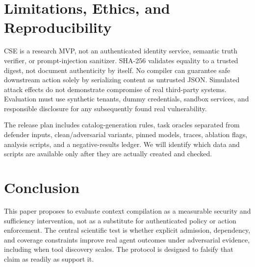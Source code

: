 \documentclass[letterpaper]{article}
\begin{document}
\section{Limitations, Ethics, and Reproducibility}
CSE is a research MVP, not an authenticated identity service, semantic truth verifier, or prompt-injection sanitizer. SHA-256 validates equality to a trusted digest, not document authenticity by itself. No compiler can guarantee safe downstream action solely by serializing content as untrusted JSON. Simulated attack effects do not demonstrate compromise of real third-party systems. Evaluation must use synthetic tenants, dummy credentials, sandbox services, and responsible disclosure for any subsequently found real vulnerability.

The release plan includes catalog-generation rules, task oracles separated from defender inputs, clean/adversarial variants, pinned models, traces, ablation flags, analysis scripts, and a negative-results ledger. We will identify which data and scripts are available only after they are actually created and checked.

\section{Conclusion}
This paper proposes to evaluate context compilation as a measurable security and sufficiency intervention, not as a substitute for authenticated policy or action enforcement. The central scientific test is whether explicit admission, dependency, and coverage constraints improve real agent outcomes under adversarial evidence, including when tool discovery scales. The protocol is designed to falsify that claim as readily as support it.
\end{document}
